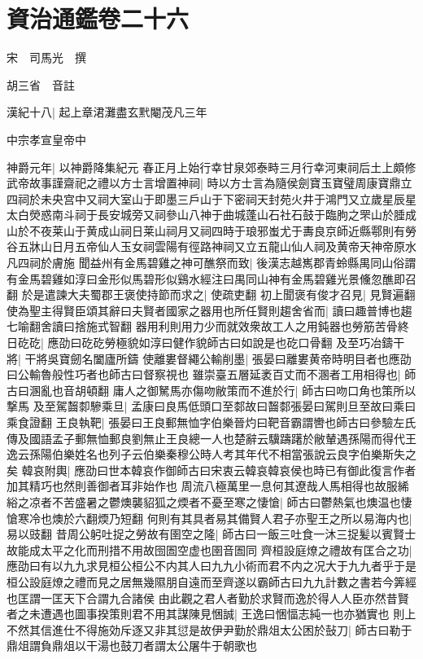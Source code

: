 \section{資治通鑑卷二十六}
宋　司馬光　撰

胡三省　音註

漢紀十八|{
	起上章涒灘盡玄黓閹茂凡三年}


中宗孝宣皇帝中

神爵元年|{
	以神爵降集紀元}
春正月上始行幸甘泉郊泰畤三月行幸河東祠后土上頗修武帝故事謹齋祀之禮以方士言增置神祠|{
	時以方士言為隨侯劍寶玉寶璧周康寶鼎立四祠於未央宫中又祠大室山于即墨三戶山于下密祠天封苑火井于鴻門又立歲星辰星太白熒惑南斗祠于長安城旁又祠參山八神于曲城蓬山石社石鼓于臨朐之罘山於腄成山於不夜莱山于黄成山祠日莱山祠月又祠四時于琅邪蚩尤于夀良京師近縣鄠則有勞谷五牀山日月五帝仙人玉女祠雲陽有徑路神祠又立五龍山仙人祠及黄帝天神帝原水凡四祠於膚施}
聞益州有金馬碧雞之神可醮祭而致|{
	後漢志越嶲郡青蛉縣禺同山俗謂有金馬碧雞如淳曰金形似馬碧形似鷄水經注曰禺同山神有金馬碧雞光景儵忽醮即召翻}
於是遣諫大夫蜀郡王褒使持節而求之|{
	使疏吏翻}
初上聞褒有俊才召見|{
	見賢遍翻}
使為聖主得賢臣頌其辭曰夫賢者國家之器用也所任賢則趨舍省而|{
	讀曰趣普博也趨七喻翻舍讀曰捨施式智翻}
器用利則用力少而就效衆故工人之用鈍器也勞筋苦骨終日矻矻|{
	應劭曰矻矻勞極貌如淳曰健作貌師古曰如說是也矻口骨翻}
及至巧冶鑄干將|{
	干將吳寶劒名闔廬所鑄}
使離婁督繩公輸削墨|{
	張晏曰離婁黄帝時明目者也應劭曰公輸魯般性巧者也師古曰督察視也}
雖崇臺五層延袤百丈而不溷者工用相得也|{
	師古曰溷亂也音胡頓翻}
庸人之御駑馬亦傷吻敝策而不進於行|{
	師古曰吻口角也策所以撃馬}
及至駕齧厀驂乘旦|{
	孟康曰良馬低頭口至䣛故曰齧䣛張晏曰駕則旦至故曰乘曰乘食證翻}
王良執靶|{
	張晏曰王良郵無恤字伯樂晉灼曰靶音霸謂轡也師古曰參驗左氏傳及國語孟子郵無恤郵良劉無止王良總一人也楚辭云驥躊躇於敝輦遇孫陽而得代王逸云孫陽伯樂姓名也列子云伯樂秦穆公時人考其年代不相當張說云良字伯樂斯失之矣}
韓哀附輿|{
	應劭曰世本韓哀作御師古曰宋衷云韓哀韓哀侯也時已有御此復言作者加其精巧也然則善御者耳非始作也}
周流八極萬里一息何其遼哉人馬相得也故服絺綌之凉者不苦盛暑之鬱燠襲貂狐之煗者不憂至寒之悽愴|{
	師古曰鬱熱氣也燠温也悽愴寒冷也燠於六翻煗乃短翻}
何則有其具者易其備賢人君子亦聖王之所以易海内也|{
	易以豉翻}
昔周公躬吐捉之勞故有圉空之隆|{
	師古曰一飯三吐食一沐三捉髪以賓賢士故能成太平之化而刑措不用故囹圄空虚也圉音圄同}
齊桓設庭燎之禮故有匡合之功|{
	應劭曰有以九九求見桓公桓公不内其人曰九九小術而君不内之况大于九九者乎于是桓公設庭燎之禮而見之居無幾隰朋自遠而至齊遂以霸師古曰九九計數之書若今筭經也匡謂一匡天下合謂九合諸侯}
由此觀之君人者勤於求賢而逸於得人人臣亦然昔賢者之未遭遇也圖事揆策則君不用其謀陳見悃誠|{
	王逸曰悃愊志純一也亦猶實也}
則上不然其信進仕不得施効斥逐又非其愆是故伊尹勤於鼎俎太公困於鼔刀|{
	師古曰勒于鼎俎謂負鼎俎以干湯也鼓刀者謂太公屠牛于朝歌也}
